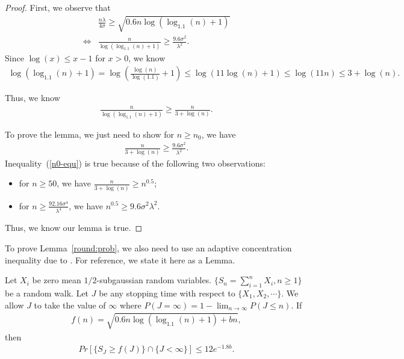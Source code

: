 \documentclass[twoside,11pt]{article}
\begin{document}
\begin{proof}
First, we observe that
\begin{align}
&\frac{n\lambda}{4\sigma}\geq \sqrt{0.6n\log(\log_{1.1}(n)+1)} \nonumber \\
\iff &\frac{n}{\log(\log_{1.1}(n)+1)}\geq \frac{9.6\sigma^2}{\lambda^2}. \nonumber 
\end{align}
Since $\log(x)\leq x-1$ for $x>0$, we know 
\begin{align}
\log(\log_{1.1}(n)+1)=\log\left(\frac{\log(n)}{\log(1.1)}+1\right)\leq \log(11\log(n)+1)\leq \log(11n)\leq 3+\log(n). \nonumber
\end{align}

Thus, we know
\begin{align}
\frac{n}{\log(\log_{1.1}(n)+1)}\geq \frac{n}{3+\log(n)}. \nonumber 
\end{align}

To prove the lemma, we just need to show for $n\geq n_{0}$, we have
\begin{align}
\frac{n}{3+\log(n)}\geq \frac{9.6\sigma^2}{\lambda^2}. \label{n0-equ}
\end{align}
Inequality~(\ref{n0-equ}) is true because of the following two observations:
\begin{itemize}
\item for $n\geq 50$, we have $\frac{n}{3+\log(n)}\geq n^{0.5}$;
\item for $n\geq \frac{92.16\sigma^4}{\lambda^4}$, we have $n^{0.5}\geq {9.6\sigma^{2}}{\lambda^{2}}$.
\end{itemize}

Thus, we know our lemma is true.

\end{proof}

To prove Lemma~\ref{round:prob}, we also need to use an adaptive concentration inequality due to \cite{zhao2016adaptive}. For reference, we state it here as a Lemma.

\begin{lemma}
Let $X_{i}$ be zero mean $1/2$-subgaussian random variables. $\{S_{n}=\sum_{i=1}^{n}X_{i},n\geq 1\}$ be a random walk. Let $J$ be any stopping time with respect to $\{X_1,X_2,\cdots\}$. We allow $J$ to take the value of $\infty$ where $P(J=\infty)=1-\lim_{n\rightarrow \infty}P(J\leq n)$. If
\begin{align}
f(n)=\sqrt{0.6n\log(\log_{1.1}(n)+1)+bn}, \nonumber
\end{align}
then
\begin{align}
Pr[\{S_{J}\geq f(J)\}\cap \{J<\infty\}]\leq 12e^{-1.8b}. \nonumber
\end{align}
\label{ACI-inequality}
\end{lemma}
\end{document}
